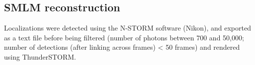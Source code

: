 \subsection{SMLM reconstruction}

Localizations were detected using the N-STORM software (Nikon), and exported as a text file before being filtered (number of photons between 700 and 50,000; number of detections (after linking across frames) < 50 frames) and rendered using ThunderSTORM.









